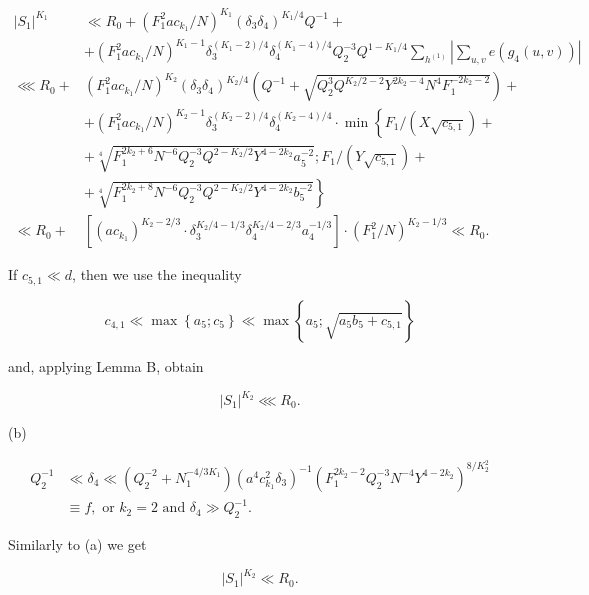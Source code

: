 \documentclass[10pt]{article}
\begin{document}
$$
\begin{aligned}
\left|S_{1}\right|^{K_{1}} & \ll R_{0}+\left(F_{1}^{2} a c_{k_{1}} / N\right)^{K_{1}}\left(\delta_{3} \delta_{4}\right)^{K_{1} / 4} Q^{-1}+ \\
& +\left(F_{1}^{2} a c_{k_{1}} / N\right)^{K_{1}-1} \delta_{3}^{\left(K_{1}-2\right) / 4} \delta_{4}^{\left(K_{1}-4\right) / 4} Q_{2}^{-3} Q^{1-K_{1} / 4} \sum_{h^{(1)}}\left|\sum_{u, v} e\left(g_{4}(u, v)\right)\right| \\
\lll R_{0}+ & \left(F_{1}^{2} a c_{k_{1}} / N\right)^{K_{2}}\left(\delta_{3} \delta_{4}\right)^{K_{2} / 4}\left(Q^{-1}+\sqrt{Q_{2}^{3} Q^{K_{2} / 2-2} Y^{2 k_{2}-4} N^{4} F_{1}^{-2 k_{2}-2}}\right)+ \\
& +\left(F_{1}^{2} a c_{k_{1}} / N\right)^{K_{2}-1} \delta_{3}^{\left(K_{2}-2\right) / 4} \delta_{4}^{\left(K_{2}-4\right) / 4} \cdot \min \left\{F_{1} /\left(X \sqrt{c_{5,1}}\right)+\right. \\
& +\sqrt[4]{F_{1}^{2 k_{2}+6} N^{-6} Q_{2}^{-3} Q^{2-K_{2} / 2} Y^{4-2 k_{2}} a_{5}^{-2}} ; F_{1} /\left(Y \sqrt{c_{5,1}}\right)+ \\
& \left.+\sqrt[4]{F_{1}^{2 k_{2}+8} N^{-6} Q_{2}^{-3} Q^{2-K_{2} / 2} Y^{4-2 k_{2}} b_{5}^{-2}}\right\} \\
\ll R_{0}+ & {\left[\left(a c_{k_{1}}\right)^{K_{2}-2 / 3} \cdot \delta_{3}^{K_{2} / 4-1 / 3} \delta_{4}^{K_{2} / 4-2 / 3} a_{4}^{-1 / 3}\right] \cdot\left(F_{1}^{2} / N\right)^{K_{2}-1 / 3} \ll R_{0} . }
\end{aligned}
$$

If $c_{5,1} \ll d$, then we use the inequality

$$
c_{4,1} \ll \max \left\{a_{5} ; c_{5}\right\} \ll \max \left\{a_{5} ; \sqrt{a_{5} b_{5}+c_{5,1}}\right\}
$$

and, applying Lemma B, obtain

$$
\left|S_{1}\right|^{K_{2}} \lll R_{0} .
$$

(b)

$$
\begin{aligned}
Q_{2}^{-1} & \ll \delta_{4} \ll\left(Q_{2}^{-2}+N_{1}^{-4 / 3 K_{1}}\right)\left(a^{4} c_{k_{1}}^{2} \delta_{3}\right)^{-1}\left(F_{1}^{2 k_{2}-2} Q_{2}^{-3} N^{-4} Y^{4-2 k_{2}}\right)^{8 / K_{2}^{2}} \\
& \equiv f, \text { or } k_{2}=2 \text { and } \delta_{4} \gg Q_{2}^{-1} .
\end{aligned}
$$

Similarly to (a) we get

$$
\left|S_{1}\right|^{K_{2}} \ll R_{0} .
$$
\end{document}

